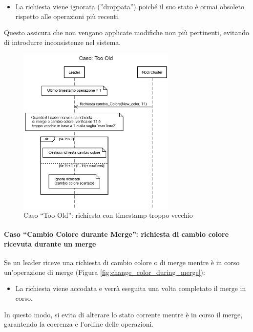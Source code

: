 \documentclass[12pt, a4paper]{report}
\begin{document}
\begin{itemize}
    \item La richiesta viene ignorata (''droppata'') poiché il suo stato \`e ormai obsoleto rispetto alle operazioni più recenti.
\end{itemize}

Questo assicura che non vengano applicate modifiche non più pertinenti, evitando di introdurre inconsistenze nel sistema.

\begin{figure}[H]
    \centering
    \includegraphics[width=0.70\textwidth,align=t]{images/concorrenza/too_old.png}
    \caption{Caso ``Too Old'': richiesta con timestamp troppo vecchio}
    \label{fig:caso_too_old}
\end{figure}

\newpage
\paragraph{Caso ``Cambio Colore durante Merge'': richiesta di cambio colore ricevuta durante un merge}\label{par:change_color_during_merge}

Se un leader riceve una richiesta di cambio colore o di merge mentre \`e in corso un'operazione di merge (Figura \ref{fig:change_color_during_merge}):

\begin{itemize}
    \item La richiesta viene accodata e verrà eseguita una volta completato il merge in corso.
\end{itemize}

In questo modo, si evita di alterare lo stato corrente mentre \`e in corso il merge, garantendo la coerenza e l'ordine delle operazioni.
\end{document}
